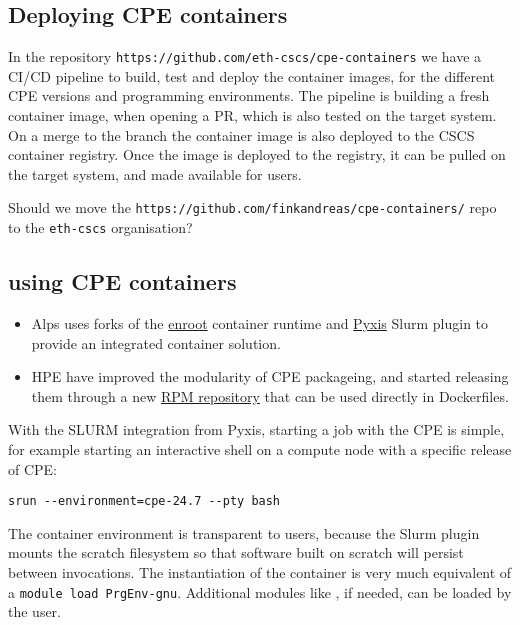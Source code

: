 \subsection{Deploying CPE containers}
\label{sec:cpe-container-deploy}

In the repository \lstinline{https://github.com/eth-cscs/cpe-containers} we have a CI/CD pipeline to build, test and deploy the container images, for the different CPE versions and programming environments.
The pipeline is building a fresh container image, when opening a PR, which is also tested on the target system.
On a merge to the  branch the container image is also deployed to the CSCS container registry.
Once the image is deployed to the registry, it can be pulled on the target system, and made available for users.


Should we move the \lstinline{https://github.com/finkandreas/cpe-containers/} repo to the \lstinline{eth-cscs} organisation?

\subsection{using CPE containers}
\label{sec:cpe-container-use}


\begin{itemize}
       \item Alps uses forks of the \href{https://github.com/NVIDIA/enroot}{enroot} container runtime and \href{https://github.com/NVIDIA/pyxis}{Pyxis} Slurm plugin to provide an integrated container solution.
       \item HPE have improved the modularity of CPE packageing, and started releasing them through a new \href{https://cpe.ext.hpe.com/docs/latest/install/installation-guidance-container.html}{RPM repository} that can be used directly in Dockerfiles.
\end{itemize}
With the SLURM integration from Pyxis, starting a job with the CPE is simple, for example starting an interactive shell on a compute node with a specific release of CPE:
\begin{lstlisting}
srun --environment=cpe-24.7 --pty bash
\end{lstlisting}
The container environment is transparent to users, because the Slurm plugin mounts the scratch filesystem so that software built on scratch will persist between invocations.
The instantiation of the container is very much equivalent of a \lstinline{module load PrgEnv-gnu}. Additional modules like , if needed, can be loaded by the user.

